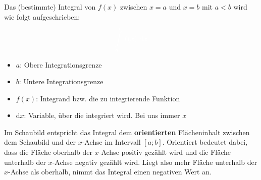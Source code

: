 Das (bestimmte) Integral von \(f(x)\) zwischen \(x=a\) und \(x=b\) mit \(a<b\) wird wie folgt aufgeschrieben:
\[\textcolor{loes}{\int\limits_a^b f(x)\td x}\]
\begin{itemize}
	\item \(a\): \textcolor{loes}{Obere Integrationsgrenze}

    \bigskip

	\item \(b\): \textcolor{loes}{Untere Integrationsgrenze}

    \bigskip

	\item \(f(x)\): \textcolor{loes}{Integrand bzw. die zu integrierende Funktion}

    \bigskip

	\item \(\text{d} x\): \textcolor{loes}{Variable, über die integriert wird. Bei uns immer \(x\)}

    \bigskip

\end{itemize}
\begin{tcolorbox}
	\textcolor{loestc}{Im Schaubild entspricht das Integral dem \textbf{orientierten} Flächeninhalt zwischen dem Schaubild und der \(x\)-Achse im Intervall \([a;b]\). Orientiert bedeutet dabei, dass die Fläche oberhalb der \(x\)-Achse positiv gezählt wird und die Fläche unterhalb der \(x\)-Achse negativ gezählt wird. Liegt also mehr Fläche unterhalb der \(x\)-Achse als oberhalb, nimmt das Integral einen negativen Wert an.}
\end{tcolorbox}
\begin{minipage}{\textwidth}
\end{minipage}
